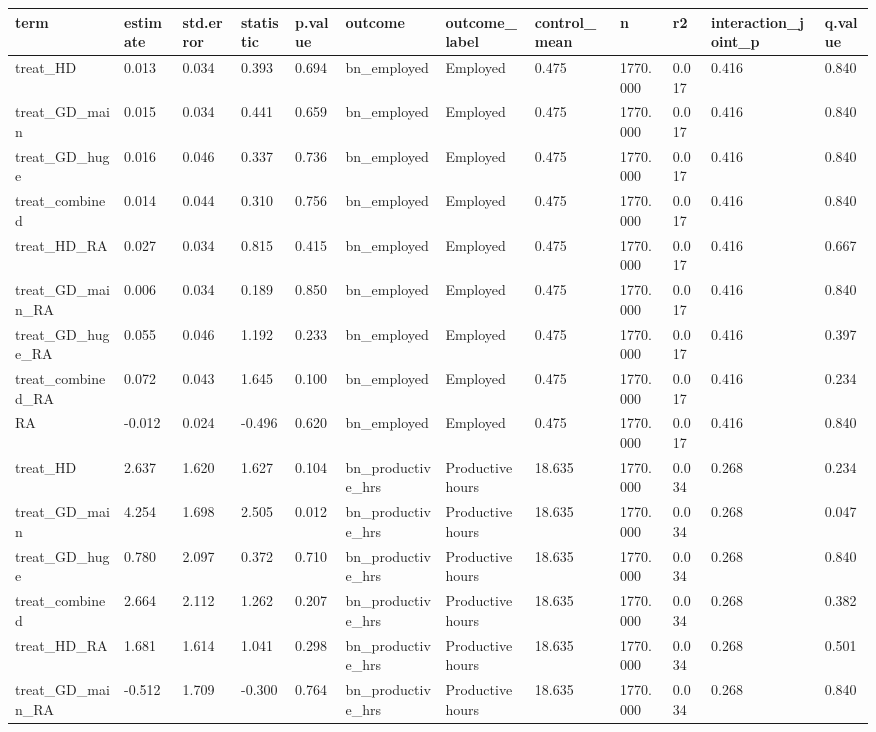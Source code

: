 \begin{tabular}{llllllllllll}
\toprule
term & estimate & std.error & statistic & p.value & outcome & outcome\_label & control\_mean & n & r2 & interaction\_joint\_p & q.value
 \\
\midrule
treat\_HD & 0.013 & 0.034 & 0.393 & 0.694 & bn\_employed & Employed & 0.475 & 1770.000 & 0.017 & 0.416 & 0.840 \\
treat\_GD\_main & 0.015 & 0.034 & 0.441 & 0.659 & bn\_employed & Employed & 0.475 & 1770.000 & 0.017 & 0.416 & 0.840 \\
treat\_GD\_huge & 0.016 & 0.046 & 0.337 & 0.736 & bn\_employed & Employed & 0.475 & 1770.000 & 0.017 & 0.416 & 0.840 \\
treat\_combined & 0.014 & 0.044 & 0.310 & 0.756 & bn\_employed & Employed & 0.475 & 1770.000 & 0.017 & 0.416 & 0.840 \\
treat\_HD\_RA & 0.027 & 0.034 & 0.815 & 0.415 & bn\_employed & Employed & 0.475 & 1770.000 & 0.017 & 0.416 & 0.667 \\
treat\_GD\_main\_RA & 0.006 & 0.034 & 0.189 & 0.850 & bn\_employed & Employed & 0.475 & 1770.000 & 0.017 & 0.416 & 0.840 \\
treat\_GD\_huge\_RA & 0.055 & 0.046 & 1.192 & 0.233 & bn\_employed & Employed & 0.475 & 1770.000 & 0.017 & 0.416 & 0.397 \\
treat\_combined\_RA & 0.072 & 0.043 & 1.645 & 0.100 & bn\_employed & Employed & 0.475 & 1770.000 & 0.017 & 0.416 & 0.234 \\
RA & -0.012 & 0.024 & -0.496 & 0.620 & bn\_employed & Employed & 0.475 & 1770.000 & 0.017 & 0.416 & 0.840 \\
treat\_HD & 2.637 & 1.620 & 1.627 & 0.104 & bn\_productive\_hrs & Productive hours & 18.635 & 1770.000 & 0.034 & 0.268 & 0.234 \\
treat\_GD\_main & 4.254 & 1.698 & 2.505 & 0.012 & bn\_productive\_hrs & Productive hours & 18.635 & 1770.000 & 0.034 & 0.268 & 0.047 \\
treat\_GD\_huge & 0.780 & 2.097 & 0.372 & 0.710 & bn\_productive\_hrs & Productive hours & 18.635 & 1770.000 & 0.034 & 0.268 & 0.840 \\
treat\_combined & 2.664 & 2.112 & 1.262 & 0.207 & bn\_productive\_hrs & Productive hours & 18.635 & 1770.000 & 0.034 & 0.268 & 0.382 \\
treat\_HD\_RA & 1.681 & 1.614 & 1.041 & 0.298 & bn\_productive\_hrs & Productive hours & 18.635 & 1770.000 & 0.034 & 0.268 & 0.501 \\
treat\_GD\_main\_RA & -0.512 & 1.709 & -0.300 & 0.764 & bn\_productive\_hrs & Productive hours & 18.635 & 1770.000 & 0.034 & 0.268 & 0.840 \\

\end{tabular}
